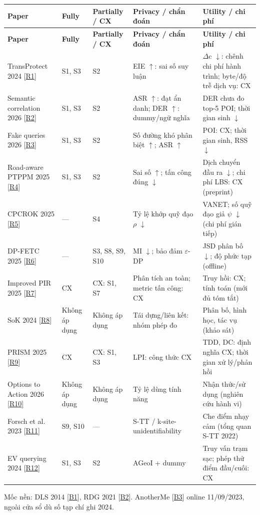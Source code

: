 \documentclass[10pt,a4paper]{article}
\begin{document}
\begingroup\small
\begin{longtable}{@{}P{3.044cm}P{1.474cm}P{2.093cm}P{4.138cm}P{5.327cm}@{}}
\toprule
\textbf{Paper} & \textbf{Fully} & \textbf{Partially / CX} & \textbf{Privacy / chẩn đoán} & \textbf{Utility / chi phí}\\\midrule
\endfirsthead
\toprule
\textbf{Paper} & \textbf{Fully} & \textbf{Partially / CX} & \textbf{Privacy / chẩn đoán} & \textbf{Utility / chi phí}\\\midrule
\endhead
\bottomrule\endfoot
TransProtect 2024 [\hyperlink{ref-R1}{R1}] & S1, S3 & S2 & EIE $\uparrow$: sai số suy luận & $\Delta$c $\downarrow$: chênh chi phí hành trình; byte/độ trễ dịch vụ: CX\\
\addlinespace[3pt]
Semantic correlation 2026 [\hyperlink{ref-R2}{R2}] & S1, S3 & S2 & ASR $\uparrow$: đạt ẩn danh; DER $\uparrow$: dummy/ngữ nghĩa & DER chưa đo top-5 POI; thời gian sinh $\downarrow$\\
\addlinespace[3pt]
Fake queries 2026 [\hyperlink{ref-R3}{R3}] & S1, S3 & S2 & Số đường khó phân biệt $\uparrow$; ASR $\uparrow$ & POI: CX; thời gian sinh, RSS $\downarrow$\\
\addlinespace[3pt]
Road-aware PTPPM 2025 [\hyperlink{ref-R4}{R4}] & S1, S3 & S2 & Sai số $\uparrow$; tấn công đúng $\downarrow$ & Dịch chuyển đầu ra $\downarrow$; chi phí LBS: CX (preprint)\\
\addlinespace[3pt]
CPCROK 2025 [\hyperlink{ref-R5}{R5}] & — & S4 & Tỷ lệ khớp quỹ đạo $\rho$ $\downarrow$ & VANET; số quỹ đạo giả $\psi$ $\downarrow$ (chi phí gián tiếp)\\
\addlinespace[3pt]
DP-FETC 2025 [\hyperlink{ref-R6}{R6}] & — & S3, S8, S9, S10 & MI $\downarrow$; bảo đảm $\varepsilon$-DP & JSD phân bố $\downarrow$; độ phức tạp (offline)\\
\addlinespace[3pt]
Improved PIR 2025 [\hyperlink{ref-R7}{R7}] & CX & CX: S1, S7 & Phân tích an toàn; metric tấn công: CX & Truy hồi: CX; tính toán (mới đủ tóm tắt)\\
\addlinespace[3pt]
SoK 2024 [\hyperlink{ref-R8}{R8}] & Không áp dụng & Không áp dụng & Tái dựng/liên kết: nhóm phép đo & Phân bố, hình học, tác vụ (khảo sát)\\
\addlinespace[3pt]
PRISM 2025 [\hyperlink{ref-R9}{R9}] & CX & CX: S1, S3 & LPI: công thức CX & TDD, DC: định nghĩa CX; thời gian xử lý/phản hồi\\
\addlinespace[3pt]
Options to Action 2026 [\hyperlink{ref-R10}{R10}] & Không áp dụng & Không áp dụng & Tỷ lệ dùng tính năng & Nhận thức/sử dụng (nghiên cứu hành vi)\\
\addlinespace[3pt]
Forsch et al. 2023 [\hyperlink{ref-R11}{R11}] & S9, S10 & — & S-TT / k-site-unidentifiability & Che điểm nhạy cảm (tổng quan S-TT 2022)\\
\addlinespace[3pt]
EV querying 2024 [\hyperlink{ref-R12}{R12}] & S1, S3 & S2 & AGeoI + dummy & Truy vấn trạm sạc; phép thử điểm đầu/cuối: CX\\
\end{longtable}
\endgroup
Mốc nền: DLS 2014 [\hyperlink{ref-B1}{B1}], RDG 2021 [\hyperlink{ref-B2}{B2}]. AnotherMe [\hyperlink{ref-B3}{B3}] online 11/09/2023, ngoài cửa sổ dù số tạp chí ghi 2024.
\end{document}
